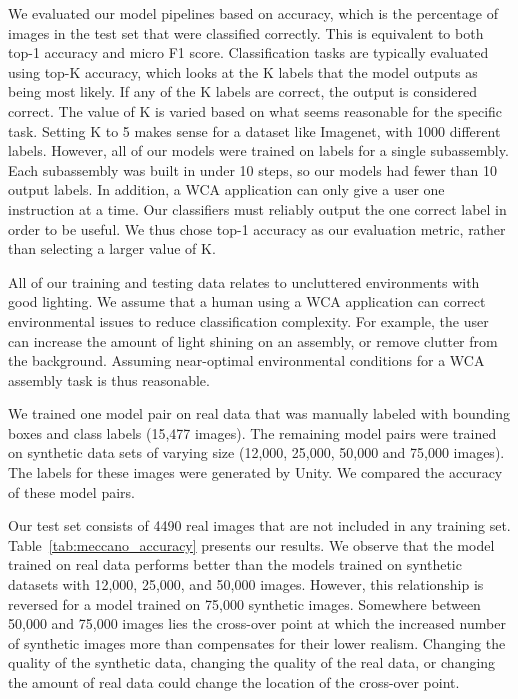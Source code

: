 We evaluated our model pipelines based on accuracy, which is the percentage of
images in the test set that were classified correctly.
This is equivalent to both top-1 accuracy and micro F1 score.
Classification tasks are typically evaluated using top-K accuracy, which
looks at the K labels that the model outputs as being most likely.
If any of the K labels are correct, the output is considered correct.
The value of K is varied based on what seems reasonable for the specific task.
Setting K to 5 makes sense for a dataset like Imagenet, with 1000 different
labels.
However, all of our models were trained on labels for a single subassembly.
Each subassembly was built in under 10 steps, so our models had fewer than 10
output labels.
In addition, a WCA application can only give a user one instruction at a time.
Our classifiers must reliably output the one correct label in order to be
useful.
We thus chose top-1 accuracy as our evaluation metric, rather than selecting a
larger value of K.

All of our training and testing data relates to
uncluttered environments with good lighting.
We assume that a human
using a WCA application can correct environmental issues to reduce
classification complexity.  For example, the user can increase the
amount of light shining on an assembly, or remove clutter from the
background.
Assuming near-optimal environmental conditions for a WCA assembly
task is thus reasonable.

We trained one model pair on real data that was manually labeled with
bounding boxes and class labels (15,477 images).
The remaining model pairs were trained on synthetic data sets of varying size
(12,000, 25,000, 50,000 and 75,000 images).
The labels for these images were generated by Unity.
We compared the accuracy of these model pairs.

Our test set consists of 4490 real images that are not included in any
training set.  Table~\ref{tab:meccano_accuracy} presents our results.  We
observe that the model trained on real data performs better than the
models trained on synthetic datasets with 12,000, 25,000, and 50,000
images.  However, this relationship is reversed for a model trained on
75,000 synthetic images.
Somewhere between 50,000 and 75,000 images
lies the cross-over point at which the increased number of synthetic
images more than compensates for their lower realism.
Changing the quality of the synthetic data, changing the quality of the real
data, or changing the amount of real data could change the location of the
cross-over point.

